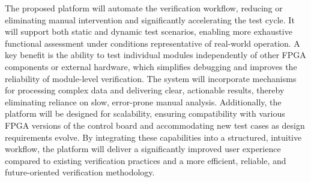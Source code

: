 The proposed platform will automate the verification workflow, reducing or eliminating manual intervention and significantly accelerating the test cycle. It will support both static and dynamic test scenarios, enabling more exhaustive functional assessment under conditions representative of real-world operation. A key benefit is the ability to test individual modules independently of other \acs{FPGA} components or external hardware, which simplifies debugging and improves the reliability of module-level verification. The system will incorporate mechanisms for processing complex data and delivering clear, actionable results, thereby eliminating reliance on slow, error-prone manual analysis. Additionally, the platform will be designed for scalability, ensuring compatibility with various \acs{FPGA} versions of the control board and accommodating new test cases as design requirements evolve. By integrating these capabilities into a structured, intuitive workflow, the platform will deliver a significantly improved user experience compared to existing verification practices and a more efficient, reliable, and future-oriented verification methodology.
	
%
%
%
%
%

